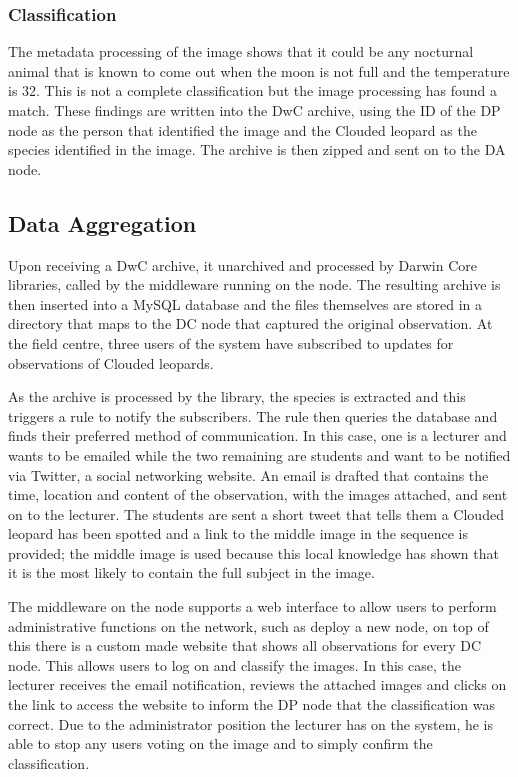 		\subsubsection{Classification}
		The metadata processing of the image shows that it could be any nocturnal animal that is known to come out when the moon is not full and the temperature is 32\celsius. This is not a complete classification but the image processing has found a match. These findings are written into the DwC archive, using the ID of the DP node as the person that identified the image and the Clouded leopard as the species identified in the image. The archive is then zipped and sent on to the DA node. 
			
	\subsection{Data Aggregation}		
			Upon receiving a DwC archive, it unarchived and processed by Darwin Core libraries, called by the middleware running on the node. The resulting archive is then inserted into a MySQL database and the files themselves are stored in a directory that maps to the DC node that captured the original observation. At the field centre, three users of the system have subscribed to updates for observations of Clouded leopards.
			
			As the archive is processed by the library, the species is extracted and this triggers a rule to notify the subscribers. The rule then queries the database and finds their preferred method of communication. In this case, one is a lecturer and wants to be emailed while the two remaining are students and want to be notified via Twitter, a social networking website. An email is drafted that contains the time, location and content of the observation, with the images attached, and sent on to the lecturer. The students are sent a short tweet that tells them a Clouded leopard has been spotted and a link to the middle image in the sequence is provided; the middle image is used because this local knowledge has shown that it is the most likely to contain the full subject in the image.
			
			The middleware on the node supports a web interface to allow users to perform administrative functions on the network, such as deploy a new node, on top of this there is a custom made website that shows all observations for every DC node. This allows users to log on and classify the images. In this case, the lecturer receives the email notification, reviews the attached images and clicks on the link to access the website to inform the DP node that the classification was correct. Due to the administrator position the lecturer has on the system, he is able to stop any users voting on the image and to simply confirm the classification.
			
